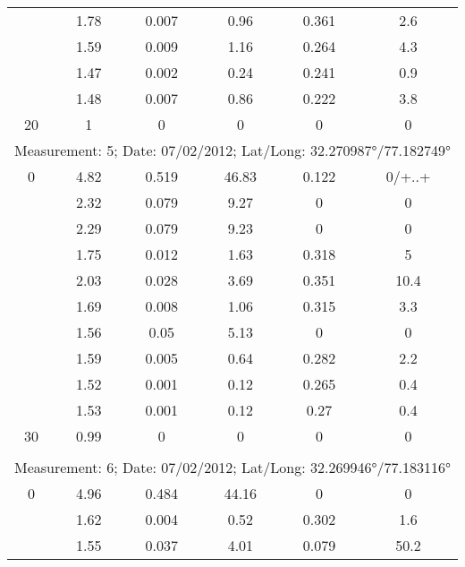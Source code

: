 \begin{longtable}{cccccc}
		& 1.78  & 0.007 & 0.96  & 0.361 & 2.6 \\
		
		& 1.59  & 0.009 & 1.16  & 0.264 & 4.3 \\
		
		& 1.47  & 0.002 & 0.24  & 0.241 & 0.9 \\
		
		& 1.48  & 0.007 & 0.86  & 0.222 & 3.8 \\
		
		20    & 1     & 0     & 0     & 0     & 0 \\ 
		\midrule
		\multicolumn{6}{l}{Measurement: 5; Date: 07/02/2012;
			Lat/Long: 32.270987°/77.182749°} \\		
		\midrule
		0     & 4.82  & 0.519 & 46.83 & 0.122 & 0/+..+ \\
		
		& 2.32  & 0.079 & 9.27  & 0     & 0 \\
		
		& 2.29  & 0.079 & 9.23  & 0     & 0 \\
		
		& 1.75  & 0.012 & 1.63  & 0.318 & 5 \\
		
		& 2.03  & 0.028 & 3.69  & 0.351 & 10.4 \\
		
		& 1.69  & 0.008 & 1.06  & 0.315 & 3.3 \\
		
		& 1.56  & 0.05  & 5.13  & 0     & 0 \\
		
		& 1.59  & 0.005 & 0.64  & 0.282 & 2.2 \\
		
		& 1.52  & 0.001 & 0.12  & 0.265 & 0.4 \\
		
		& 1.53  & 0.001 & 0.12  & 0.27  & 0.4 \\
		
		30    & 0.99  & 0     & 0     & 0     & 0 \\ \\ 
		\multicolumn{6}{l}{Measurement: 6; Date: 07/02/2012;
			Lat/Long: 32.269946°/77.183116°} \\		
		\midrule
		0 & 4.96  & 0.484 & 44.16 & 0     & 0 \\
		
		& 1.62  & 0.004 & 0.52  & 0.302 & 1.6 \\
		
		& 1.55  & 0.037 & 4.01  & 0.079 & 50.2 \\
		

\end{longtable}
